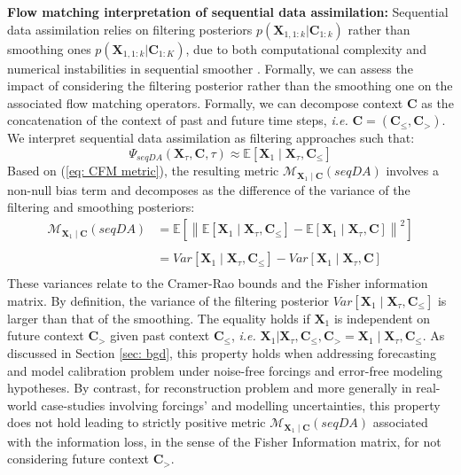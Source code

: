 \documentclass[10pt]{article}
\begin{document}
{\bf Flow matching interpretation of sequential data assimilation:} Sequential data assimilation relies on filtering posteriors $p(\mathbf{X}_{1,1:k}|\mathbf{C}_{1:k})$ rather than smoothing ones $p(\mathbf{X}_{1,1:k}|\mathbf{C}_{1:K})$, due to both computational complexity and numerical instabilities in sequential smoother \cite{carrassi_data_2018}. Formally, we can assess the impact of considering the filtering posterior rather than the smoothing one on the associated flow matching operators. Formally, we can decompose context $\mathbf{C}$ as the concatenation of the context of past and future time steps, {\em i.e.} $\mathbf{C}=(\mathbf{C}_\leq,\mathbf{C}_>)$. We interpret sequential data assimilation as filtering approaches such that: 
\begin{equation}
    \label{eq:filtering approx}
    \Psi_{seqDA}\left (\mathbf{X}_\tau, \mathbf{C},\tau \right ) \approx 
    \mathbb{E}\left [\mathbf{X}_1 \mid \mathbf{X}_\tau,\mathbf{C}_\leq\right ]
\end{equation}
Based on (\ref{eq: CFM metric}), the resulting metric $\mathcal{M}_{\mathbf{X}_1\mid \mathbf{C}}\left( seqDA \right)$ involves a non-null bias term and decomposes as the difference of the variance of the filtering and smoothing posteriors:
\begin{align}
        \label{eq: seqDA cfm}
    \mathcal{M}_{\mathbf{X}_1\mid \mathbf{C}}\left( seqDA \right)  &= 
    \mathbb{E} \left [  \left \| {\mathbb{E}\left [\mathbf{X}_1 \mid \mathbf{X}_\tau,\mathbf{C}_\leq\right ] - \mathbb{E}\left [\mathbf{X}_1 \mid \mathbf{X}_\tau,\mathbf{C}\right ] }\right \|^2 \right ]\\~\\
    &=
    Var \left [ \mathbf{X}_1 \mid \mathbf{X}_\tau,\mathbf{C}_\leq\right ] - Var \left [\mathbf{X}_1 \mid \mathbf{X}_\tau,\mathbf{C}\right ] \\
\end{align}
These variances relate to the Cramer-Rao bounds \cite{bishop_pattern_2006} and the Fisher information matrix. By definition, the variance of the filtering posterior $Var \left [ \mathbf{X}_1 \mid \mathbf{X}_\tau,\mathbf{C}_\leq\right ]$ is larger than that of the smoothing. The equality holds if $\mathbf{X}_1$ is independent on future context $\mathbf{C}_>$ given past context $\mathbf{C}_\leq$, {\em i.e.}  $\mathbf{X}_1 | \mathbf{X}_\tau,\mathbf{C}_\leq,\mathbf{C}_> = \mathbf{X}_1 \mid \mathbf{X}_\tau,\mathbf{C}_\leq$. As discussed in Section \ref{sec: bgd}, this property holds when addressing forecasting and model calibration problem under noise-free forcings and error-free modeling hypotheses. By contrast, for reconstruction problem and more generally in real-world case-studies involving forcings' and modelling uncertainties, this property does not hold leading to strictly positive metric $\mathcal{M}_{\mathbf{X}_1\mid \mathbf{C}}\left( seqDA \right)$ associated with the information loss, in the sense of the Fisher Information matrix, for not considering future context $\mathbf{C}_>$.   
\end{document}
